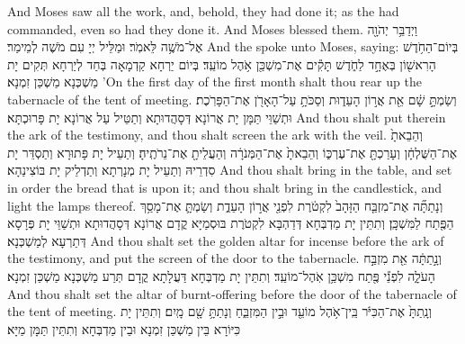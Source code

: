 {And Moses saw all the work, and, behold, they had done it; as the \lord\space had commanded, even so had they done it. And Moses blessed them.}{}
\newperek
{}%
{וַיְדַבֵּ֥ר יְהֹוָ֖ה אֶל־מֹשֶׁ֥ה לֵּאמֹֽר׃}
{וּמַלֵּיל יְיָ עִם מֹשֶׁה לְמֵימַר׃}
{And the \lord\space spoke unto Moses, saying:}{}
{בְּיוֹם־הַחֹ֥דֶשׁ הָרִאשׁ֖וֹן בְּאֶחָ֣ד לַחֹ֑דֶשׁ תָּקִ֕ים אֶת־מִשְׁכַּ֖ן אֹ֥הֶל מוֹעֵֽד׃}
{בְּיוֹם יַרְחָא קַדְמָאָה בְּחַד לְיַרְחָא תְּקִים יָת מַשְׁכְּנָא מַשְׁכַּן זִמְנָא׃}
{’On the first day of the first month shalt thou rear up the tabernacle of the tent of meeting.}{}
{וְשַׂמְתָּ֣ שָׁ֔ם אֵ֖ת אֲר֣וֹן הָעֵד֑וּת וְסַכֹּתָ֥ עַל־הָאָרֹ֖ן אֶת־הַפָּרֹֽכֶת׃
}
{וּתְשַׁוֵּי תַּמָּן יָת אֲרוֹנָא דְּסָהֲדוּתָא וְתַטֵּיל עַל אֲרוֹנָא יָת פָּרוּכְתָּא׃}
{And thou shalt put therein the ark of the testimony, and thou shalt screen the ark with the veil.}{}
{וְהֵבֵאתָ֙ אֶת־הַשֻּׁלְחָ֔ן וְעָרַכְתָּ֖ אֶת־עֶרְכּ֑וֹ וְהֵבֵאתָ֙ אֶת־הַמְּנֹרָ֔ה וְהַעֲלֵיתָ֖ אֶת־נֵרֹתֶֽיהָ׃
}
{וְתַעֵיל יָת פָּתוּרָא וְתַסְדֵּר יָת סִדְרֵיהּ וְתַעֵיל יָת מְנָרְתָא וְתַדְלֵיק יָת בּוֹצִינַהָא׃}
{And thou shalt bring in the table, and set in order the bread that is upon it; and thou shalt bring in the candlestick, and light the lamps thereof.}{}
{וְנָתַתָּ֞ה אֶת־מִזְבַּ֤ח הַזָּהָב֙ לִקְטֹ֔רֶת לִפְנֵ֖י אֲר֣וֹן הָעֵדֻ֑ת וְשַׂמְתָּ֛ אֶת־מָסַ֥ךְ הַפֶּ֖תַח לַמִּשְׁכָּֽן׃}
{וְתִתֵּין יָת מַדְבְּחָא דְּדַהְבָּא לִקְטֹרֶת בּוּסְמַיָּא קֳדָם אֲרוֹנָא דְּסָהֲדוּתָא וּתְשַׁוֵּי יָת פְּרָסָא דְּתַרְעָא לְמַשְׁכְּנָא׃}
{And thou shalt set the golden altar for incense before the ark of the testimony, and put the screen of the door to the tabernacle.}{}
{וְנָ֣תַתָּ֔ה אֵ֖ת מִזְבַּ֣ח הָעֹלָ֑ה לִפְנֵ֕י פֶּ֖תַח מִשְׁכַּ֥ן אֹֽהֶל־מוֹעֵֽד׃}
{וְתִתֵּין יָת מַדְבְּחָא דַּעֲלָתָא קֳדָם תְּרַע מַשְׁכְּנָא מַשְׁכַּן זִמְנָא׃}
{And thou shalt set the altar of burnt-offering before the door of the tabernacle of the tent of meeting.}{}
{וְנָֽתַתָּ֙ אֶת־הַכִּיֹּ֔ר בֵּֽין־אֹ֥הֶל מוֹעֵ֖ד וּבֵ֣ין הַמִּזְבֵּ֑חַ וְנָתַתָּ֥ שָׁ֖ם מָֽיִם׃}
{וְתִתֵּין יָת כִּיּוֹרָא בֵּין מַשְׁכַּן זִמְנָא וּבֵין מַדְבְּחָא וְתִתֵּין תַּמָּן מַיָּא׃}
